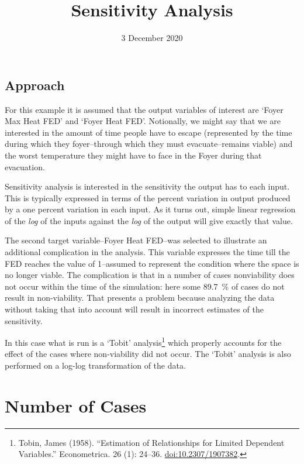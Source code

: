 \documentclass[
]{article}
\title{Sensitivity Analysis}
\author{}
\date{\vspace{-2.5em}3 December 2020}
\begin{document}
\maketitle

\hypertarget{approach}{%
\subsection{Approach}\label{approach}}

For this example it is assumed that the output variables of interest are
`Foyer Max Heat FED' and `Foyer Heat FED'. Notionally, we might say that
we are interested in the amount of time people have to escape (represented
by the time during which they foyer--through which they must
evacuate--remains viable) and the worst temperature they might have to
face in the Foyer during that evacuation.

Sensitivity analysis is interested in the sensitivity the output has to
each input. This is typically expressed in terms of the percent
variation in output produced by a one percent variation in each input.
As it turns out, simple linear regression of the \emph{log} of the
inputs against the \emph{log} of the output will give exactly that
value.

The second target variable--Foyer Heat FED--was selected to illustrate
an additional complication in the analysis. This variable expresses the
time till the FED reaches the value of 1--assumed to represent the
condition where the space is no longer viable. The complication is that
in a number of cases nonviability does not occur within the time of the
simulation: here some 89.7~\% of cases do not result in non-viability.
That presents a problem because analyzing the data without taking that
into account will result in incorrect estimates of the sensitivity.

In this case what is run is a `Tobit' analysis\footnote{Tobin, James
  (1958). ``Estimation of Relationships for Limited Dependent
  Variables.'' Econometrica. 26 (1): 24--36. \url{doi:10.2307/1907382}.}
which properly accounts for the effect of the cases where non-viability
did not occur. The `Tobit' analysis is also performed on a log-log
transformation of the data.

\hypertarget{number-of-cases}{%
\section{Number of Cases}\label{number-of-cases}}
\end{document}
